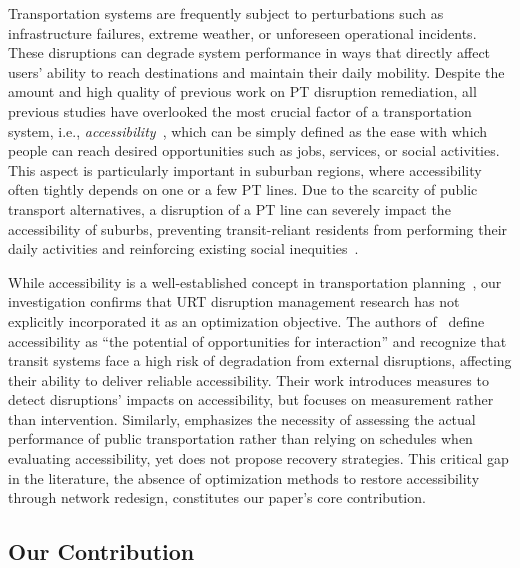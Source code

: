 \documentclass[3p,times,procedia]{elsarticle}
\begin{document}
Transportation systems are frequently subject to perturbations such as infrastructure failures, extreme weather, or unforeseen operational incidents. These disruptions can degrade system performance in ways that directly affect users’ ability to reach destinations and maintain their daily mobility.
Despite the amount and high quality of previous work on PT disruption remediation, all previous studies have overlooked the most crucial factor of a transportation system, i.e., \emph{accessibility}~\citep{hansen1959accessibility,miller2020measuring}, which can be simply defined as the ease with which people can reach desired opportunities such as jobs, services, or social activities. This aspect is particularly important in suburban regions, where accessibility often tightly depends on one or a few PT lines. Due to the scarcity of public transport alternatives, a disruption of a PT line can severely impact the accessibility of suburbs, preventing transit-reliant residents from performing their daily activities and reinforcing existing social inequities~\citep{lucas2012transport,karner2018assessing}.

While accessibility is a well-established concept in transportation planning~\citep{geurs2004accessibility,handy1997measuring,miller2020measuring}, our investigation confirms that URT disruption management research has not explicitly incorporated it as an optimization objective. The authors of~\citet{liu2024measuring} define accessibility as ``the potential of opportunities for interaction'' and recognize that transit systems face a high risk of degradation from external disruptions, affecting their ability to deliver reliable accessibility. Their work introduces measures to detect disruptions' impacts on accessibility, but focuses on measurement rather than intervention. Similarly, \citet{nalin2025evaluation} emphasizes the necessity of assessing the actual performance of public transportation rather than relying on schedules when evaluating accessibility, yet does not propose recovery strategies. 
%
This critical gap in the literature, the absence of optimization methods to restore accessibility through network redesign, constitutes our paper's core contribution.

\subsection{Our Contribution}
\end{document}
